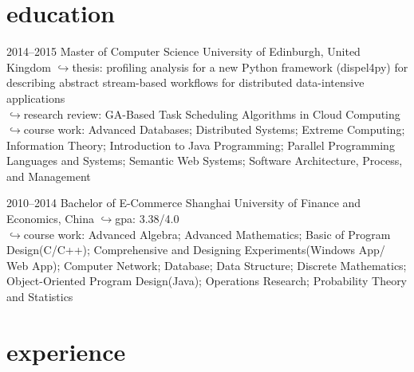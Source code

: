 \documentclass[]{friggeri-cv} %
\begin{document}
\section{education}

\begin{entrylist}
\entry
{2014--2015}
{Master {\normalfont of Computer Science}}
{University of Edinburgh, United Kingdom}
{{\color{red} $\hookrightarrow$}thesis: profiling analysis for a new Python framework (dispel4py) for describing abstract stream-based workflows for distributed data-intensive applications\\
{\color{red} $\hookrightarrow$}research review: GA-Based Task Scheduling Algorithms in Cloud Computing\\
{\color{red} $\hookrightarrow$}course work: Advanced Databases; Distributed Systems; Extreme Computing; Information Theory; Introduction to Java Programming; Parallel Programming Languages and Systems; Semantic Web Systems; Software Architecture, Process, and Management
}

\entry
{2010--2014}
{Bachelor {\normalfont of E-Commerce}}
{Shanghai University of Finance and Economics, China}
{
{\color{red} $\hookrightarrow$}gpa: 3.38/4.0\\
{\color{red} $\hookrightarrow$}course work:
Advanced Algebra; Advanced Mathematics; Basic of Program Design(C/C++); Comprehensive and Designing Experiments(Windows App/ Web App); Computer Network; Database; Data Structure; Discrete Mathematics; Object-Oriented Program Design(Java); Operations Research; Probability Theory and Statistics
}
\end{entrylist}


\section{experience}
\end{document}
